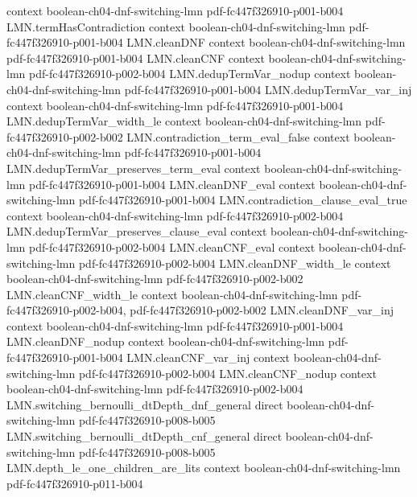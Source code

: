 \begin{theorem}
  {context}
  {boolean-ch04-dnf-switching-lmn}
  {pdf-fc447f326910-p001-b004}
\proofstep
  {LMN.termHasContradiction}
  {context}
  {boolean-ch04-dnf-switching-lmn}
  {pdf-fc447f326910-p001-b004}
\proofstep
  {LMN.cleanDNF}
  {context}
  {boolean-ch04-dnf-switching-lmn}
  {pdf-fc447f326910-p001-b004}
\proofstep
  {LMN.cleanCNF}
  {context}
  {boolean-ch04-dnf-switching-lmn}
  {pdf-fc447f326910-p002-b004}
\proofstep
  {LMN.dedupTermVar_nodup}
  {context}
  {boolean-ch04-dnf-switching-lmn}
  {pdf-fc447f326910-p001-b004}
\proofstep
  {LMN.dedupTermVar_var_inj}
  {context}
  {boolean-ch04-dnf-switching-lmn}
  {pdf-fc447f326910-p001-b004}
\proofstep
  {LMN.dedupTermVar_width_le}
  {context}
  {boolean-ch04-dnf-switching-lmn}
  {pdf-fc447f326910-p002-b002}
\proofstep
  {LMN.contradiction_term_eval_false}
  {context}
  {boolean-ch04-dnf-switching-lmn}
  {pdf-fc447f326910-p001-b004}
\proofstep
  {LMN.dedupTermVar_preserves_term_eval}
  {context}
  {boolean-ch04-dnf-switching-lmn}
  {pdf-fc447f326910-p001-b004}
\proofstep
  {LMN.cleanDNF_eval}
  {context}
  {boolean-ch04-dnf-switching-lmn}
  {pdf-fc447f326910-p001-b004}
\proofstep
  {LMN.contradiction_clause_eval_true}
  {context}
  {boolean-ch04-dnf-switching-lmn}
  {pdf-fc447f326910-p002-b004}
\proofstep
  {LMN.dedupTermVar_preserves_clause_eval}
  {context}
  {boolean-ch04-dnf-switching-lmn}
  {pdf-fc447f326910-p002-b004}
\proofstep
  {LMN.cleanCNF_eval}
  {context}
  {boolean-ch04-dnf-switching-lmn}
  {pdf-fc447f326910-p002-b004}
\proofstep
  {LMN.cleanDNF_width_le}
  {context}
  {boolean-ch04-dnf-switching-lmn}
  {pdf-fc447f326910-p002-b002}
\proofstep
  {LMN.cleanCNF_width_le}
  {context}
  {boolean-ch04-dnf-switching-lmn}
  {pdf-fc447f326910-p002-b004,
    pdf-fc447f326910-p002-b002}
\proofstep
  {LMN.cleanDNF_var_inj}
  {context}
  {boolean-ch04-dnf-switching-lmn}
  {pdf-fc447f326910-p001-b004}
\proofstep
  {LMN.cleanDNF_nodup}
  {context}
  {boolean-ch04-dnf-switching-lmn}
  {pdf-fc447f326910-p001-b004}
\proofstep
  {LMN.cleanCNF_var_inj}
  {context}
  {boolean-ch04-dnf-switching-lmn}
  {pdf-fc447f326910-p002-b004}
\proofstep
  {LMN.cleanCNF_nodup}
  {context}
  {boolean-ch04-dnf-switching-lmn}
  {pdf-fc447f326910-p002-b004}
\proofstep
  {LMN.switching_bernoulli_dtDepth_dnf_general}
  {direct}
  {boolean-ch04-dnf-switching-lmn}
  {pdf-fc447f326910-p008-b005}
\proofstep
  {LMN.switching_bernoulli_dtDepth_cnf_general}
  {direct}
  {boolean-ch04-dnf-switching-lmn}
  {pdf-fc447f326910-p008-b005}
\proofstep
  {LMN.depth_le_one_children_are_lits}
  {context}
  {boolean-ch04-dnf-switching-lmn}
  {pdf-fc447f326910-p011-b004}

\end{theorem}
